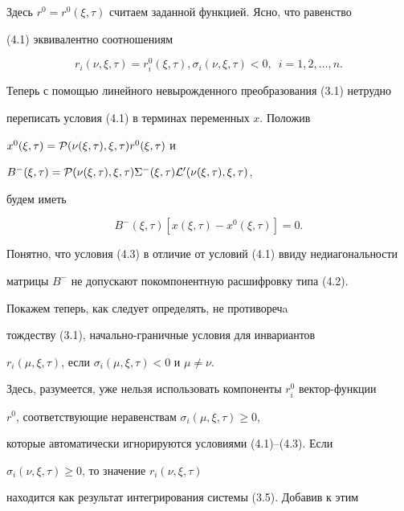 Здесь $r^0=r^0 (\xi,\tau)$ считаем заданной функцией. Ясно, что равенство


(4.1) эквивалентно соотношениям


\begin{equation}


r_i (\nu,\xi,\tau)=r^0_i (\xi,\tau), \sigma_i (\nu, \xi,\tau) < 0, 


\ \; i=1,2,\dotsc,n.


\end{equation}


Теперь с помощью линейного невырожденного преобразования (3.1) нетрудно 


переписать условия (4.1) в терминах переменных $x$. Положив 


$x^0 (\xi,\tau)={\cal P}(\nu(\xi,\tau),\xi,\tau) r^0 (\xi, \tau)$ и


$B^{-}(\xi,\tau)={\cal P}(\nu(\xi,\tau),\xi,\tau) 


\Sigma^{-}(\xi,\tau) {\cal L}^{\prime} (\nu(\xi, \tau), \xi,\tau)$,


будем иметь


\begin{equation}


B^{-}(\xi,\tau) [x(\xi, \tau) - x^{0} (\xi,\tau)]=0.


\end{equation}


Понятно, что условия (4.3) в отличие от условий (4.1) ввиду недиагональности


матрицы $B^{-}$ не допускают покомпонентную расшифровку типа (4.2).





Покажем теперь, как следует определять, не противоречa 


тождеству (3.1), начально-гра\-нич\-ные условия для инвариантов 


$r_i (\mu,\xi,\tau)$, если $\sigma_i (\mu, \xi,\tau) < 0$ и $\mu \neq \nu$.


Здесь, разумеется, уже нельзя использовать компоненты $r_i^0$ вектор-функции


$r^0$, соответствующие неравенствам $\sigma_i (\mu, \xi,\tau) \geq 0$, 


которые автоматически игнорируются условиями (4.1)--(4.3). Если 


$\sigma_i (\nu, \xi,\tau) \geq 0$, то значение $r_i (\nu,\xi,\tau)$ 


находится как результат интегрирования системы (3.5). Добавив к этим 



